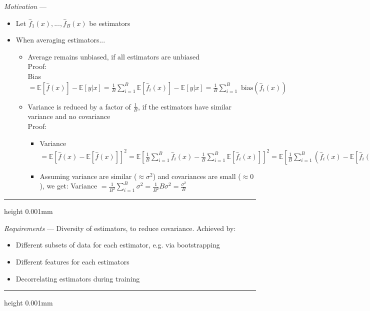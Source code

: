 \emph{Motivation} ---
\begin{itemize}
    \item Let $\hat{f}_1(x), ..., \hat{f}_B(x)$ be estimators
    \item When averaging estimators...
    \begin{itemize}
        \item Average remains unbiased, if all estimators are unbiased\\
        Proof:\\
        Bias $= \mathbb{E} [ \hat{f}(x) ] - \mathbb{E} [ y | x ] = \frac{1}{B} \sum_{i=1}^B \mathbb{E} [ \hat{f}_i(x) ] - \mathbb{E} [ y | x ] = \frac{1}{B} \sum_{i=1}^B \textrm{ bias}(\hat{f}_i(x))$
        \item Variance is reduced by a factor of $\frac{1}{B}$, if the estimators have similar variance and no covariance\\
        Proof:
        \begin{itemize}
            \item Variance $= \mathbb{E} [ \hat{f}(x) - \mathbb{E} [ \hat{f}(x) ]]^2 = \mathbb{E} [ \frac{1}{B} \sum_{i=1}^B \hat{f}_i(x) - \frac{1}{B} \sum_{i=1}^B \mathbb{E} [ \hat{f}_i(x) ] ]^2 = \mathbb{E} [ \frac{1}{B} \sum_{i=1}^B (\hat{f}_i(x) - \mathbb{E} [ \hat{f}_i(x) ]) ]^2 = \frac{1}{B^2} \sum_{i=1}^B \mathbb{V} [ \hat{f}_i(x) ] + \frac{1}{B^2} \sum \sum_{i \neq j =1}^B \textrm{ Cov}[ \hat{f}_i(x), \hat{f}_j(x) ] $
            \item Assuming variance are similar ($\approx \sigma^2$) and covariances are small ($\approx 0$), we get: Variance $= \frac{1}{B^2} \sum_{i=1}^B \sigma^2 = \frac{1}{B^2} B \sigma^2 = \frac{\sigma^2}{B}$
        \end{itemize}
    \end{itemize}
\end{itemize}

{\color{lightgray}\hrule height 0.001mm}

\emph{Requirements} --- 
Diversity of estimators, to reduce covariance. Achieved by:
\begin{itemize}
    \item Different subsets of data for each estimator, e.g. via bootstrapping
    \item Different features for each estimators
    \item Decorrelating estimators during training
\end{itemize}

{\color{lightgray}\hrule height 0.001mm}

